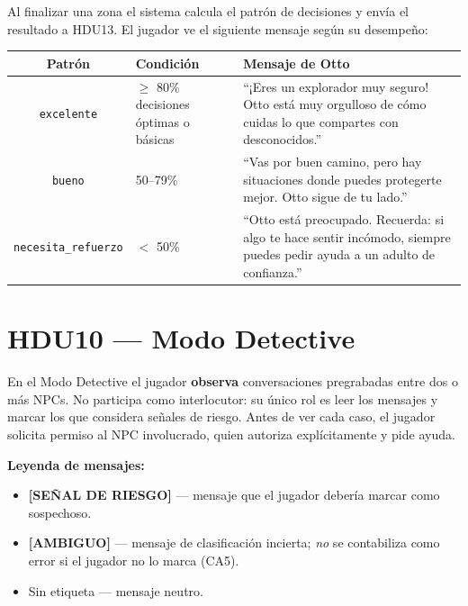 \documentclass[12pt,a4paper]{article}
\begin{document}
Al finalizar una zona el sistema calcula el patrón de decisiones y envía el resultado a HDU13.
El jugador ve el siguiente mensaje según su desempeño:

\begin{center}
\begin{tabular}{clp{7cm}}
\toprule
\textbf{Patrón} & \textbf{Condición} & \textbf{Mensaje de Otto} \\
\midrule
\texttt{excelente}          & $\geq$ 80\% decisiones óptimas o básicas
  & ``¡Eres un explorador muy seguro! Otto está muy orgulloso de cómo cuidas lo que compartes con desconocidos.'' \\[6pt]
\texttt{bueno}              & 50--79\%
  & ``Vas por buen camino, pero hay situaciones donde puedes protegerte mejor. Otto sigue de tu lado.'' \\[6pt]
\texttt{necesita\_refuerzo} & $<$ 50\%
  & ``Otto está preocupado. Recuerda: si algo te hace sentir incómodo, siempre puedes pedir ayuda a un adulto de confianza.'' \\
\bottomrule
\end{tabular}
\end{center}

\newpage
\section{HDU10 --- Modo Detective}

En el Modo Detective el jugador \textbf{observa} conversaciones pregrabadas entre dos o más NPCs.
No participa como interlocutor: su único rol es leer los mensajes y marcar los que considera
señales de riesgo.
Antes de ver cada caso, el jugador solicita permiso al NPC involucrado, quien autoriza
explícitamente y pide ayuda.

\medskip
\noindent\textbf{Leyenda de mensajes:}

\begin{itemize}
  \item \textcolor{insegura}{\textbf{[SEÑAL DE RIESGO]}} --- mensaje que el jugador debería marcar como sospechoso.
  \item \textcolor{basica}{\textbf{[AMBIGUO]}} --- mensaje de clasificación incierta; \emph{no} se contabiliza como error si el jugador no lo marca (CA5).
  \item Sin etiqueta --- mensaje neutro.
\end{itemize}
\end{document}
